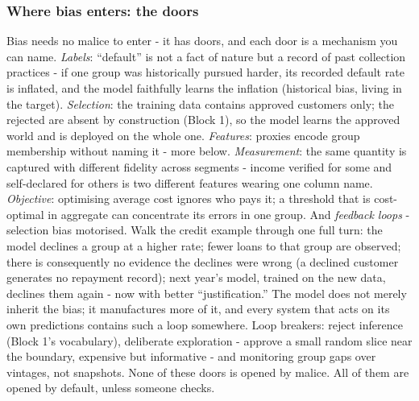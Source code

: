 \documentclass[11pt,a4paper]{article}
\begin{document}
\subsubsection{Where bias enters: the doors}
Bias needs no malice to enter - it has doors, and each door is a
mechanism you can name. \emph{Labels}: ``default'' is not a fact of
nature but a record of past collection practices - if one group was
historically pursued harder, its recorded default rate is inflated, and
the model faithfully learns the inflation (historical bias, living in
the target). \emph{Selection}: the training data contains approved
customers only; the rejected are absent by construction (Block 1), so
the model learns the approved world and is deployed on the whole one.
\emph{Features}: proxies encode group membership without naming it -
more below. \emph{Measurement}: the same quantity is captured with
different fidelity across segments - income verified for some and
self-declared for others is two different features wearing one column
name. \emph{Objective}: optimising average
cost ignores who pays it; a threshold that is cost-optimal in aggregate
can concentrate its errors in one group. And \emph{feedback loops} -
selection bias motorised. Walk the credit example through one full turn:
the model declines a group at a higher rate; fewer loans to that group
are observed; there is consequently no evidence the declines were wrong
(a declined customer generates no repayment record); next year's model,
trained on the new data, declines them again - now with better
``justification.'' The model does not merely inherit the bias; it
manufactures more of it, and every system that acts on its own
predictions contains such a loop somewhere. Loop breakers: reject
inference (Block 1's vocabulary), deliberate exploration - approve a
small random slice near the boundary, expensive but informative - and
monitoring group gaps over vintages, not snapshots. None of these doors
is opened by malice. All of them are opened by default, unless someone
checks.
\end{document}
